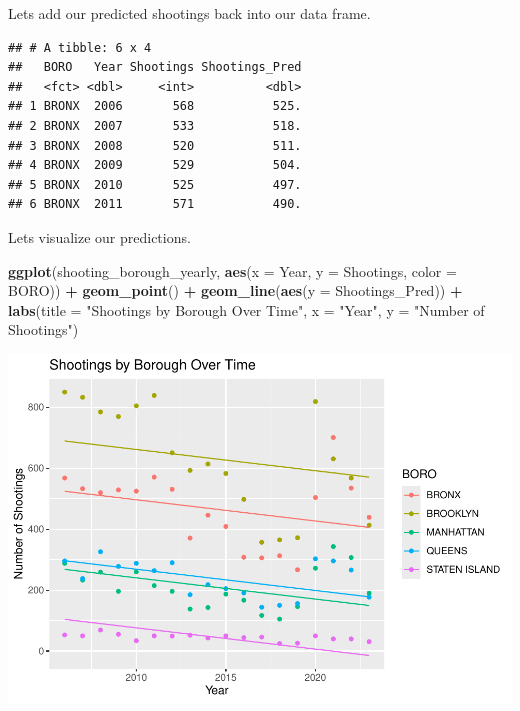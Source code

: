 \documentclass[
]{article}
\newenvironment{Shaded}{\begin{snugshade}}{\end{snugshade}}
\newcommand{\AttributeTok}[1]{\textcolor[rgb]{0.13,0.29,0.53}{#1}}
\newcommand{\FunctionTok}[1]{\textcolor[rgb]{0.13,0.29,0.53}{\textbf{#1}}}
\newcommand{\NormalTok}[1]{#1}
\newcommand{\OtherTok}[1]{\textcolor[rgb]{0.56,0.35,0.01}{#1}}
\newcommand{\SpecialCharTok}[1]{\textcolor[rgb]{0.81,0.36,0.00}{\textbf{#1}}}
\newcommand{\StringTok}[1]{\textcolor[rgb]{0.31,0.60,0.02}{#1}}
\begin{document}
Lets add our predicted shootings back into our data frame.

\begin{Shaded}
\end{Shaded}

\begin{verbatim}
## # A tibble: 6 x 4
##   BORO   Year Shootings Shootings_Pred
##   <fct> <dbl>     <int>          <dbl>
## 1 BRONX  2006       568           525.
## 2 BRONX  2007       533           518.
## 3 BRONX  2008       520           511.
## 4 BRONX  2009       529           504.
## 5 BRONX  2010       525           497.
## 6 BRONX  2011       571           490.
\end{verbatim}

Lets visualize our predictions.

\begin{Shaded}
\begin{Highlighting}[]
\FunctionTok{ggplot}\NormalTok{(shooting\_borough\_yearly, }\FunctionTok{aes}\NormalTok{(}\AttributeTok{x =}\NormalTok{ Year, }\AttributeTok{y =}\NormalTok{ Shootings, }\AttributeTok{color =}\NormalTok{ BORO)) }\SpecialCharTok{+}
  \FunctionTok{geom\_point}\NormalTok{() }\SpecialCharTok{+}
  \FunctionTok{geom\_line}\NormalTok{(}\FunctionTok{aes}\NormalTok{(}\AttributeTok{y =}\NormalTok{ Shootings\_Pred)) }\SpecialCharTok{+}
  \FunctionTok{labs}\NormalTok{(}\AttributeTok{title =} \StringTok{"Shootings by Borough Over Time"}\NormalTok{,}
       \AttributeTok{x =} \StringTok{"Year"}\NormalTok{,}
       \AttributeTok{y =} \StringTok{"Number of Shootings"}\NormalTok{)}
\end{Highlighting}
\end{Shaded}

\includegraphics{nypd-shooting-data-analysis_files/figure-latex/visualize-predictions-1.pdf}
\end{document}
